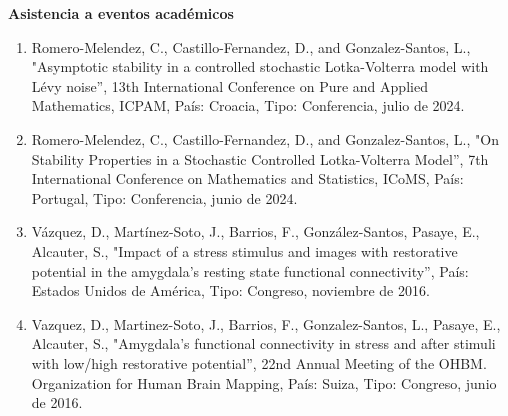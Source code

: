 {\large \textbf{Asistencia a eventos académicos}}

\hrulefill

\begin{enumerate}

\item  Romero-Melendez, C., Castillo-Fernandez, D., and Gonzalez-Santos, L., "Asymptotic stability in a controlled stochastic 
Lotka-Volterra 
model with Lévy noise”, 13th International Conference on Pure and Applied Mathematics, ICPAM, País: Croacia, Tipo: Conferencia, julio de 
2024.

\item  Romero-Melendez, C., Castillo-Fernandez, D., and Gonzalez-Santos, L., "On Stability Properties in a Stochastic Controlled 
Lotka-Volterra 
Model”, 7th International Conference on Mathematics and Statistics, ICoMS, País: Portugal, Tipo: Conferencia, junio de 2024.

\item  Vázquez, D., Martínez-Soto, J., Barrios, F., González-Santos, Pasaye, E., Alcauter, S., "Impact of a stress stimulus and images with 
restorative potential in the amygdala’s resting state functional connectivity”, País: Estados Unidos de América, Tipo: Congreso, noviembre de 
2016.

\item Vazquez, D., Martinez-Soto, J., Barrios, F., Gonzalez-Santos, L., Pasaye, E., Alcauter, S., "Amygdala's functional connectivity in 
stress 
and after stimuli with low/high restorative potential”, 22nd Annual Meeting of the OHBM. Organization for Human Brain Mapping, País: Suiza, 
Tipo: Congreso, junio de 2016.
\end{enumerate}

